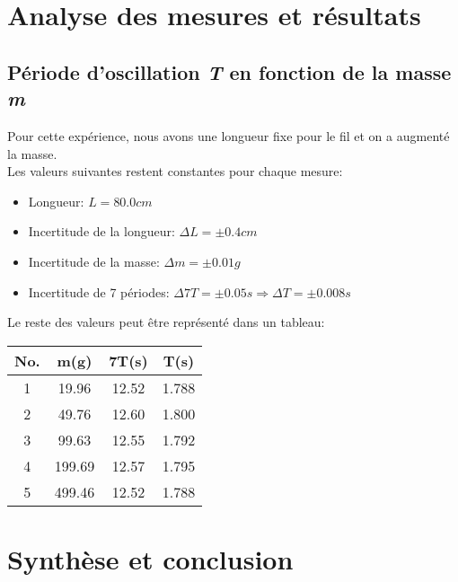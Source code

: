 \documentclass[12pt,a4paper]{article}
\begin{document}
    \section{Analyse des mesures et résultats}
    \subsection{Période d'oscillation \textit{T} en fonction de la masse \textit{m}}
    Pour cette expérience, nous avons une longueur fixe pour le fil et on a augmenté la masse. \\
    Les valeurs suivantes restent constantes pour chaque mesure:
    \begin{itemize}
        \item Longueur: $L=80.0cm$
        \item Incertitude de la longueur: $\Delta L=\pm 0.4cm$
        \item Incertitude de la masse: $\Delta m=\pm 0.01g$
        \item Incertitude de 7 périodes: $\Delta 7T=\pm 0.05s \Rightarrow \Delta T=\pm 0.008s$
    \end{itemize}
    Le reste des valeurs peut être représenté dans un tableau:
    \begin{table}[htbp]
        \centering
        \begin{tabular}{c|c|c|c}
            \textbf{No.} & \textbf{m(g)} & \textbf{7T(s)} & \textbf{T(s)} \\
            \toprule
            1 & 19.96 & 12.52 & 1.788 \\
            2 & 49.76 & 12.60 & 1.800 \\
            3 & 99.63 & 12.55 & 1.792 \\
            4 & 199.69 & 12.57 & 1.795 \\
            5 & 499.46 & 12.52 & 1.788 \\
        \end{tabular}
    \end{table}
    \section{Synthèse et conclusion}
\end{document}
